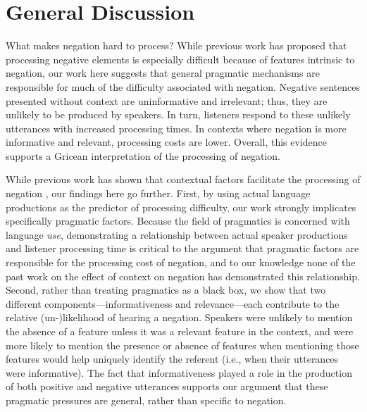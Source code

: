 \documentclass[man, noapacite]{apa2}
\begin{document}
\section{General Discussion}

What makes negation hard to process? While previous work has proposed that processing negative elements is especially difficult because of features intrinsic to negation, our work here suggests that general pragmatic mechanisms are responsible for much of the difficulty associated with negation. Negative sentences presented without context are uninformative and irrelevant; thus, they are unlikely to be produced by speakers. In turn, listeners respond to these unlikely utterances with increased processing times. In contexts where negation is more informative and relevant, processing costs are lower. Overall, this evidence supports a Gricean interpretation of the processing of negation.

While previous work has shown that contextual factors facilitate the processing of negation \cite{wason1965,nieuwland2008,dale2011,orenes2014}, our findings here go further. First, by using actual language productions as the predictor of processing difficulty, our work strongly implicates specifically pragmatic factors. Because the field of pragmatics is concerned with language \emph{use}, demonstrating a relationship between actual speaker productions and listener processing time is critical to the argument that pragmatic factors are responsible for the processing cost of negation, and to our knowledge none of the past work on the effect of context on negation has demonstrated this relationship. Second, rather than treating pragmatics as a black box, we show that two different components---informativeness and relevance---each contribute to the relative (un-)likelihood of hearing a negation. Speakers were unlikely to mention the absence of a feature unless it was a relevant feature in the context, and were more likely to mention the presence or absence of features when mentioning those features would help uniquely identify the referent (i.e., when their utterances were informative). The fact that informativeness played a role in the production of both positive and negative utterances supports our argument that these pragmatic pressures are general, rather than specific to negation. 
\end{document}
